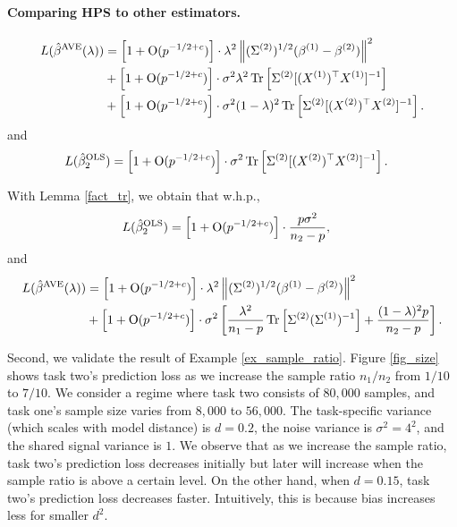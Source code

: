 \paragraph{Comparing HPS to other estimators.}
    \begin{align}
    L(\hat{\beta}^{\AV}(\lambda) ) &= \left[ 1+ \OO(p^{-1/2+c})\right] \cdot \lambda^2 \left\| (\Sigma^{(2)})^{1/2}(\beta^{(1)}-\beta^{(2)})\right\|^2 \nonumber \\
    &+  \left[ 1+ \OO(p^{-1/2+c})\right] \cdot \sigma^2   \lambda^2 \bigtr{\Sigma^{(2)} [(X^{(1)})^\top X^{(1)}]^{-1}  }\nonumber\\
    & + \left[ 1+ \OO(p^{-1/2+c})\right] \cdot \sigma^2  (1-\lambda)^2 \bigtr{\Sigma^{(2)} [(X^{(2)})^\top X^{(2)}]^{-1}  }  . \label{L_AVE_simple}
    \end{align}
    and
    \begin{align}
    L(\hat{\beta}_2^{\STL} ) &= \left[ 1+ \OO(p^{-1/2+c})\right] \cdot \sigma^2  \bigtr{\Sigma^{(2)} [(X^{(2)})^\top X^{(2)}]^{-1}  }  . \label{L_STL_simple}
    \end{align}
    
 With Lemma \ref{fact_tr}, we obtain that w.h.p.,
\begin{align}
L(\hat{\beta}_2^{\STL} ) &= \left[ 1+ \OO(p^{-1/2+c})\right] \cdot \frac{p \sigma^2 }{n_2-p}   , \label{L_STL_simple01}
\end{align}
and
\begin{align}
L(\hat{\beta}^{\AV}(\lambda) ) &= \left[ 1+ \OO(p^{-1/2+c})\right] \cdot \lambda^2 \left\| (\Sigma^{(2)})^{1/2}(\beta^{(1)}-\beta^{(2)})\right\|^2 \nonumber \\
&+  \left[ 1+ \OO(p^{-1/2+c})\right] \cdot \sigma^2 \left[\frac{ \lambda^2}{n_1-p}\bigtr{\Sigma^{(2)}(\Sigma^{(1)})^{-1}} + \frac{(1-\lambda)^2p  }{n_2-p}\right] . \label{L_AVE_simple01}
 \end{align}    

Second, we validate the result of Example \ref{ex_sample_ratio}.
Figure \ref{fig_size} shows task two's prediction loss  as we increase the sample ratio $n_1 / n_2$ from $1/10$ to $7/10$.
We consider a regime where task two consists of $80,000$ samples, and task one's sample size varies from $8,000$ to $56,000$.
The task-specific variance (which scales with model distance) is $d = 0.2$, the noise variance is $\sigma^2 = 4^2$, and the shared signal variance is $1$. We observe that as we increase the sample ratio, task two's prediction loss decreases initially but later will increase when the sample ratio is above a certain level.
On the other hand, when $d = 0.15$, task two's prediction loss decreases faster.
Intuitively, this is because bias increases less for smaller $d^2$.





